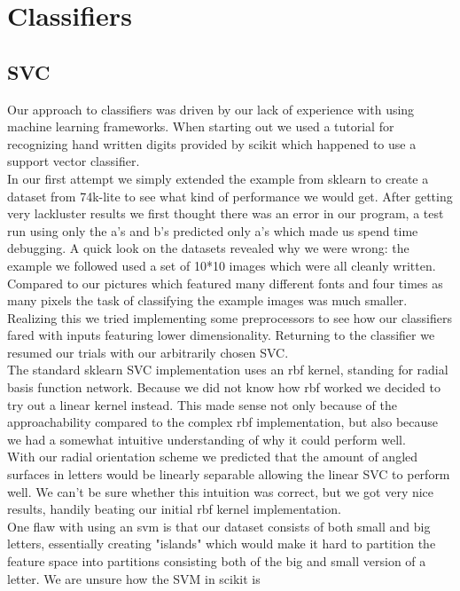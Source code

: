 \documentclass[paper=a4, fontsize=11pt]{scrartcl} %
\numberwithin{equation}{section} %
\numberwithin{figure}{section} %
\numberwithin{table}{section} %
\begin{document}
\section{Classifiers}
\subsection{SVC}
Our approach to classifiers was driven by our lack of experience with
using machine learning frameworks.  When starting out we used a
tutorial for recognizing hand written digits provided by scikit which
happened to use a support vector classifier.\\
In our first attempt we simply extended the example from sklearn to
create a dataset from 74k-lite to see what kind of performance we
would get.  After getting very lackluster results we first thought
there was an error in our program, a test run using only the a's and
b's predicted only a's which made us spend time debugging.  A quick
look on the datasets revealed why we were wrong: the example we
followed used a set of 10*10 images which were all cleanly written.\\
Compared to our pictures which featured many different fonts and four
times as many pixels the task of classifying the example images was
much smaller.  Realizing this we tried implementing some preprocessors
to see how our classifiers fared with inputs featuring lower
dimensionality.  Returning to the classifier we resumed our trials
with our arbitrarily chosen SVC.\\  The standard sklearn SVC
implementation uses an rbf kernel, standing for radial basis function
network.  Because we did not know how rbf worked we decided to try out
a linear kernel instead.  This made sense not only because of the
approachability compared to the complex rbf implementation, but also
because we had a somewhat intuitive understanding of why it could
perform well.\\  With our radial orientation scheme we predicted that
the amount of angled surfaces in letters would be linearly separable
allowing the linear SVC to perform well.  We can't be sure whether
this intuition was correct, but we got very nice results, handily
beating our initial rbf kernel implementation.\\  One flaw with using an
svm is that our dataset consists of both small and big letters,
essentially creating "islands" which would make it hard to partition
the feature space into partitions consisting both of the big and small
version of a letter.  We are unsure how the SVM in scikit is
\end{document}
